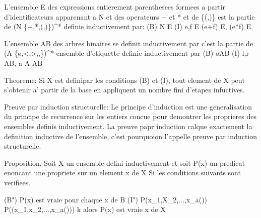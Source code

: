\documentclass{article}
\begin{document}
L'ensemble E des expressions entierement parenthesees formees a partir d'identificateurs apparenant a N et des operateurs + et * et de \{(,)\}
est la partie de (N \cup \{+,*,(,)\})^*
definie inductivement par:
	(B) N \subseteq E
	(I) e,f \in E (e+f) \in E, (e*f) \in E


L'ensemble AB des arbres binaires se definit inductivement par c'est la partie de 
	(A \cup \{\o,<,>,,\})^* ensemble d'etiquette
definie inductivement par
	(B) \o \in AB
	(I) l,r \in AB, a \in A \rightarrow <a,g,d> \in AB


Theoreme: Si X est definipar les conditions (B) et (I), tout element de X peut s'obtenir a' partir de la base en appliquent un nombre fini d'etapes infuctives.

Preuve par induction structurelle:
Le principe d'induction est une generalisation du principe de recurrence sur les entiers concue pour demontrer les proprieres des ensembles definis inductivement.
La preuve papr induction calque exactement la definition inductive de l'ensemble, c'est pourquoion l'appelle preuve par induction structurelle.


Proposition, Soit X un ensemble defini inductivement et soit P(x) un predicat enoncant une propriete sur un element x de X 
Si les conditions suivants sont verifiees.

(B") P(x) est vraie pour chaque x de B
(I") P(x_1,X_2,...,x_{a(\phi)}) \rightarrow P(\phi(x_1,x_2,...,x_{a(\phi)}))
\forall \phi \in k
alors P(x) est vraie \forall x de X
\end{document}
